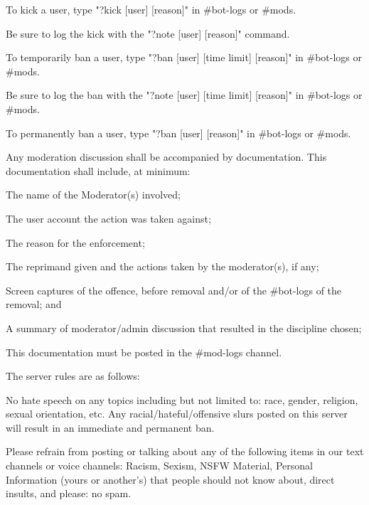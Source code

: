 \begin{longenum}[ label*=\thesubsection.\arabic*., align=left]
\begin{longenum}[label*=\arabic*., align=left]
\begin{longenum}[label*=\arabic*., align=left]
			\item To kick a user, type "?kick [user] [reason]" in \#bot-logs or \#mods.
				\begin{longenum}[label*=\arabic*., align=left]
				\item Be sure to log the kick with the "?note [user] [reason]" command.
				\end{longenum}	
			\item To temporarily ban a user, type "?ban [user] [time limit] [reason]" in \#bot-logs or \#mods.
				\begin{longenum}[label*=\arabic*., align=left]
				\item Be sure to log the ban with the "?note [user] [time limit] [reason]" in \#bot-logs or \#mods.
				\end{longenum}	
			\item To permanently ban a user, type "?ban [user] [reason]" in \#bot-logs or \#mods.
			\end{longenum}	
		\item Any moderation discussion shall be accompanied by documentation. This documentation shall include, at minimum:
			\begin{longenum}[label*=\arabic*., align=left]
			\item The name of the Moderator(s) involved;
			\item The user account the action was taken against;
			\item The reason for the enforcement;
			\item The reprimand given and the actions taken by the moderator(s), if any;
			\item Screen captures of the offence, before removal and/or of the \#bot-logs of the removal; and
			\item A summary of moderator/admin discussion that resulted in the discipline chosen;
			\item This documentation must be posted in the \#mod-logs channel.
			\end{longenum}	
		\end{longenum}	
	\item The server rules are as follows:
		\begin{longenum}[label*=\arabic*., align=left]	
			\item No hate speech on any topics including but not limited to: race, gender, religion, sexual orientation, etc. Any racial/hateful/offensive slurs posted on this server will result in an immediate and permanent ban.
			\item Please refrain from posting or talking about any of the following items in our text channels or voice channels: Racism, Sexism, NSFW Material, Personal Information (yours or another's) that people should not know about, direct insults, and please: no spam.

\end{longenum}
\end{longenum}
